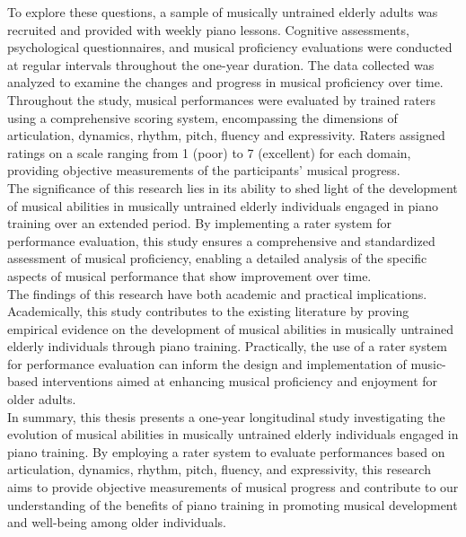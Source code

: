 To explore these questions, a sample of musically untrained elderly adults was recruited and provided with weekly piano lessons. Cognitive assessments, psychological questionnaires, and musical proficiency evaluations were conducted at regular intervals throughout the one-year duration. The data collected was analyzed to examine the changes and progress in musical proficiency over time. Throughout the study, musical performances were evaluated by trained raters using a comprehensive scoring system, encompassing the dimensions of articulation, dynamics, rhythm, pitch, fluency and expressivity. Raters assigned ratings on a scale ranging from 1 (poor) to 7 (excellent) for each domain, providing objective measurements of the participants' musical progress.\\
The significance of this research lies in its ability to shed light of the development of musical abilities in musically untrained elderly individuals engaged in piano training over an extended period. By implementing a rater system for performance evaluation, this study ensures a comprehensive and standardized assessment of musical proficiency, enabling a detailed analysis of the specific aspects of musical performance that show improvement over time.\\
The findings of this research have both academic and practical implications. Academically, this study contributes to the existing literature by proving empirical evidence on the development of musical abilities in musically untrained elderly individuals through piano training. Practically, the use of a rater system for performance evaluation can inform the design and implementation of music-based interventions aimed at enhancing musical proficiency and enjoyment for older adults.\\
In summary, this thesis presents a one-year longitudinal study investigating the evolution of musical abilities in musically untrained elderly individuals engaged in piano training. By employing a rater system to evaluate performances based on articulation, dynamics, rhythm, pitch, fluency, and expressivity, this research aims to provide objective measurements of musical progress and contribute to our understanding of the benefits of piano training in promoting musical development and well-being among older individuals. \\


